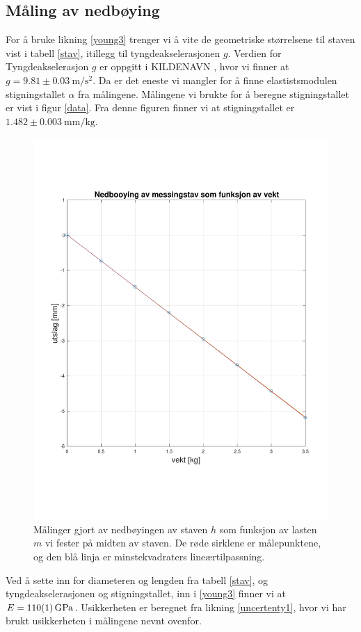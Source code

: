 \documentclass[%
 reprint,
 amsmath,amssymb,
 aps,
]{revtex4-1}
\begin{document}
\subsection{Måling av nedbøying}
For å bruke likning \eqref{young3} trenger vi å vite de geometriske størrelsene til staven vist i tabell \vref{stav}, itillegg til tyngdeakselerasjonen $g$. Verdien for Tyngdeakselerasjon $g$ er oppgitt i KILDENAVN \cite{tyngde}, hvor vi finner at $g=9.81\pm\SI{0.03}{\meter\per\second^2}$. Da er det eneste vi mangler for å finne elastistsmodulen stigningstallet $\alpha$ fra målingene. Målingene vi brukte for å beregne stigningstallet er vist i figur \vref{data}. Fra denne figuren finner vi at stigningstallet er $1.482\pm\SI{0.003}{\milli\meter\per\kilo\gram}$.
\begin{figure}[h!]
  \centering
  \includegraphics[scale=0.4]{nedbojing.pdf}
  \caption{Målinger gjort av nedbøyingen av staven $h$ som funksjon av lasten $m$ vi fester på midten av staven. De røde sirklene er målepunktene, og den blå linja er minstekvadraters lineærtilpassning.}
  \label{data}
\end{figure}
Ved å sette inn for diameteren og lengden fra tabell \vref{stav}, og tyngdeakselerasjonen og stigningstallet, inn i \eqref{young3} finner vi at $E=\SI{110\pm1}{\giga\pascal}$. Usikkerheten er beregnet fra likning \eqref{uncertenty1}, hvor vi har brukt usikkerheten i målingene nevnt ovenfor.
\end{document}
